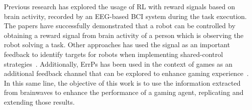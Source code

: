 \documentclass[journal]{IEEEtran}
\begin{document}
Previous research has explored the usage of RL with reward signals based on brain activity, recorded by an EEG-based BCI system during the task execution. The papers \cite{ROBOT-CONTROL-PAPER,Omedes2013} have successfully demonstrated that a robot can be controlled by obtaining a reward signal from brain activity of a person which is observing the robot solving a task.  Other approaches has used the signal as an important feedback to identify targets for robots when implementing shared-control strategies~\cite{Schiatti2018}.  Additionally, ErrPs has been used in the context of games as an additional feedback channel that can be explored to enhance gaming experience~\cite{Plass-OudeBos2010}.  In this same line, the objective of this work is to use the information extracted from brainwaves to enhance the performance of a gaming agent, replicating and extending those results.




%
%

\end{document}
